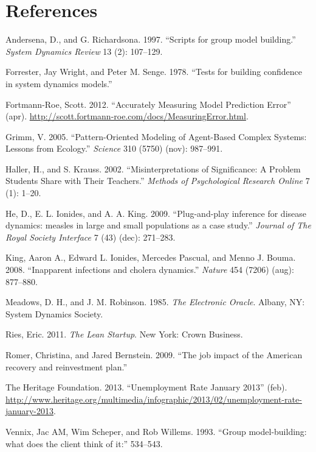 \documentclass[]{memoir}
\begin{document}
\chapter{References}

Andersena, D., and G. Richardsona. 1997. ``Scripts for group model
building.'' \emph{System Dynamics Review} 13 (2): 107--129.

Forrester, Jay Wright, and Peter M. Senge. 1978. ``Tests for building
confidence in system dynamics models.''

Fortmann-Roe, Scott. 2012. ``Accurately Measuring Model Prediction
Error'' (apr).
\url{http://scott.fortmann-roe.com/docs/MeasuringError.html}.

Grimm, V. 2005. ``Pattern-Oriented Modeling of Agent-Based Complex
Systems: Lessons from Ecology.'' \emph{Science} 310 (5750) (nov):
987--991.

Haller, H., and S. Krauss. 2002. ``Misinterpretations of Significance: A
Problem Students Share with Their Teachers.'' \emph{Methods of
Psychological Research Online} 7 (1): 1--20.

He, D., E. L. Ionides, and A. A. King. 2009. ``Plug-and-play inference
for disease dynamics: measles in large and small populations as a case
study.'' \emph{Journal of The Royal Society Interface} 7 (43) (dec):
271--283.

King, Aaron A., Edward L. Ionides, Mercedes Pascual, and Menno J. Bouma.
2008. ``Inapparent infections and cholera dynamics.'' \emph{Nature} 454
(7206) (aug): 877--880.

Meadows, D. H., and J. M. Robinson. 1985. \emph{The Electronic Oracle}.
Albany, NY: System Dynamics Society.

Ries, Eric. 2011. \emph{The Lean Startup}. New York: Crown Business.

Romer, Christina, and Jared Bernstein. 2009. ``The job impact of the
American recovery and reinvestment plan.''

The Heritage Foundation. 2013. ``Unemployment Rate January 2013'' (feb).
\url{http://www.heritage.org/multimedia/infographic/2013/02/unemployment-rate-january-2013}.

Vennix, Jac AM, Wim Scheper, and Rob Willems. 1993. ``Group
model-building: what does the client think of it:'' 534--543.
\end{document}
